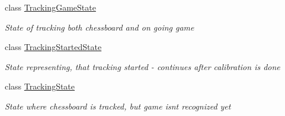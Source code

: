 \begin{DoxyCompactItemize}
class \mbox{\hyperlink{class_chess_tracking_1_1_controlling_elements_1_1_program_state_1_1_states_1_1_tracking_game_state}{Tracking\+Game\+State}}
\begin{DoxyCompactList}\small\item\em State of tracking both chessboard and on going game \end{DoxyCompactList}\item 
class \mbox{\hyperlink{class_chess_tracking_1_1_controlling_elements_1_1_program_state_1_1_states_1_1_tracking_started_state}{Tracking\+Started\+State}}
\begin{DoxyCompactList}\small\item\em State representing, that tracking started -\/ continues after calibration is done \end{DoxyCompactList}\item 
class \mbox{\hyperlink{class_chess_tracking_1_1_controlling_elements_1_1_program_state_1_1_states_1_1_tracking_state}{Tracking\+State}}
\begin{DoxyCompactList}\small\item\em State where chessboard is tracked, but game isn\textquotesingle{}t recognized yet \end{DoxyCompactList}\end{DoxyCompactItemize}
